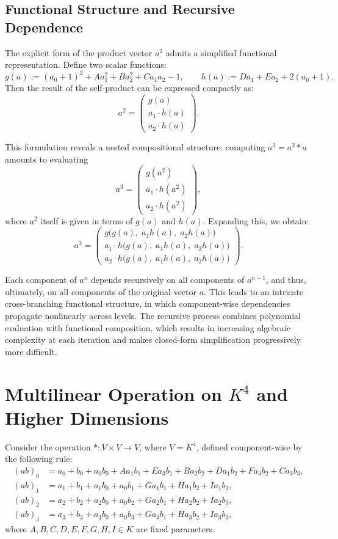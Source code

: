\documentclass[12pt]{article}
\theoremstyle{definition}
\theoremstyle{plain}
\theoremstyle{remark}
\begin{document}
\subsection*{Functional Structure and Recursive Dependence}

The explicit form of the product vector \( a^2 \) admits a simplified functional representation. Define two scalar functions:
\[
g(a) := (a_0 + 1)^2 + A a_1^2 + B a_2^2 + C a_1 a_2 - 1, \qquad
h(a) := D a_1 + E a_2 + 2(a_0 + 1).
\]
Then the result of the self-product can be expressed compactly as:
\[
a^2 =
\begin{pmatrix}
g(a) \\
a_1 \cdot h(a) \\
a_2 \cdot h(a)
\end{pmatrix}.
\]

This formulation reveals a nested compositional structure: computing \( a^3 = a^2 * a \) amounts to evaluating
\[
a^3 =
\begin{pmatrix}
g(a^2) \\
a_1 \cdot h(a^2) \\
a_2 \cdot h(a^2)
\end{pmatrix},
\]
where \( a^2 \) itself is given in terms of \( g(a) \) and \( h(a) \). Expanding this, we obtain:
\[
a^3 =
\begin{pmatrix}
g\big(g(a),\; a_1 h(a),\; a_2 h(a)\big) \\
a_1 \cdot h\big(g(a),\; a_1 h(a),\; a_2 h(a)\big) \\
a_2 \cdot h\big(g(a),\; a_1 h(a),\; a_2 h(a)\big)
\end{pmatrix}.
\]

Each component of \( a^n \) depends recursively on all components of \( a^{n-1} \), and thus, ultimately, on all components of the original vector \( a \). This leads to an intricate cross-branching functional structure, in which component-wise dependencies propagate nonlinearly across levels. The recursive process combines polynomial evaluation with functional composition, which results in increasing algebraic complexity at each iteration and makes closed-form simplification progressively more difficult.

\section{Multilinear Operation on \texorpdfstring{$K^4$}{K⁴} and Higher Dimensions}

Consider the operation \( * : V \times V \to V \), where \( V = K^4 \), defined component-wise by the following rule:
\begin{align*}
(ab)_0 &= a_0 + b_0 + a_0 b_0 + A a_1 b_1 + E a_3 b_1 + B a_2 b_2 + D a_1 b_2 + F a_3 b_2 + C a_3 b_3 , \\
(ab)_1 &= a_1 + b_1 + a_1 b_0 + a_0 b_1 + G a_1 b_1 + H a_1 b_2 + I a_1 b_3, \\
(ab)_2 &= a_2 + b_2 + a_2 b_0 + a_0 b_2 + G a_2 b_1 + H a_2 b_2 + I a_2 b_3, \\
(ab)_3 &= a_3 + b_3 + a_3 b_0 + a_0 b_3 + G a_3 b_1 + H a_3 b_2 + I a_3 b_3,
\end{align*}
where \( A, B, C, D, E, F, G, H, I \in K \) are fixed parameters.
\end{document}
